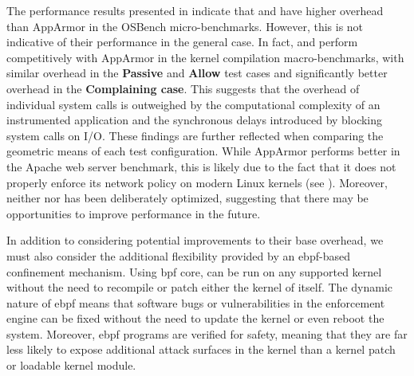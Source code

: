 The performance results presented in  indicate that \bpfbox{} and
\bpfcontain{} have higher overhead than AppArmor in the OSBench micro-benchmarks.
However, this is not indicative of their performance in the general case. In fact,
\bpfbox{} and \bpfcontain{} perform competitively with AppArmor in the kernel compilation
macro-benchmarks, with similar overhead in the \textbf{Passive} and \textbf{Allow} test
cases and significantly better overhead in the \textbf{Complaining case}. This suggests
that the overhead of individual system calls is outweighed by the computational complexity
of an instrumented application and the synchronous delays introduced by blocking system
calls on I/O. These findings are further reflected when comparing the geometric means of
each test configuration. While AppArmor performs better in the Apache web server
benchmark, this is likely due to the fact that it does not properly enforce its network
policy on modern Linux kernels (see ). Moreover, neither
\bpfbox{} nor \bpfcontain{} has been deliberately optimized, suggesting that there may be
opportunities to improve performance in the future.

In addition to considering potential improvements to their base overhead, we must also
consider the additional flexibility provided by an \gls{ebpf}-based confinement mechanism.
Using \gls{bpf} \gls{core}, \bpfcontain{} can be run on any supported kernel without the
need to recompile or patch either the kernel of \bpfcontain{} itself. The dynamic nature
of \gls{ebpf} means that software bugs or vulnerabilities in the enforcement engine can be
fixed without the need to update the kernel or even reboot the system. Moreover,
\gls{ebpf} programs are verified for safety, meaning that they are far less likely to
expose additional attack surfaces in the kernel than a kernel patch or loadable kernel
module.



